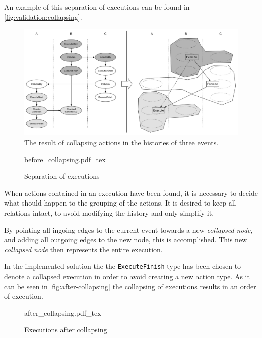 	An example of this separation of executions can be found in \autoref{fig:validation:collapsing}.
	
	\begin{figure}[H]
		\centering
		\includegraphics[width=\textwidth]{6orderofexecution/images/transitive-reduction-collapse.pdf}
		\caption{The result of collapsing actions in the histories of three events.}
		\label{fig:validation:collapsing}
	\end{figure}
	
	\begin{figure}
		\centering
		\def\svgwidth{0.42\columnwidth}
		\fontsize{6}{8}\selectfont
		{before_collapsing.pdf_tex}
		\caption{Separation of executions}
		\label{fig:before-collapsing}
	\end{figure}
	
	\newpar When actions contained in an execution have been found, it is necessary to decide what should happen to the grouping of the actions. It is desired to keep all relations intact, to avoid modifying the history and only simplify it. 
	
	By pointing all ingoing edges to the current event towards a new \textit{collapsed node}, and adding all outgoing edges to the new node, this is accomplished. This new \textit{collapsed node} then represents the entire execution. 
	
	In the implemented solution the the \texttt{ExecuteFinish} type has been chosen to denote a collapsed execution in order to avoid creating a new action type. As it can be seen in \autoref{fig:after-collapsing} the collapsing of executions results in an order of execution.
	
	\begin{figure}
		\centering
		\def\svgwidth{0.22\columnwidth}
		\fontsize{6}{8}\selectfont
		{after_collapsing.pdf_tex}
		\caption{Executions after collapsing}
		\label{fig:after-collapsing}
	\end{figure}
	
